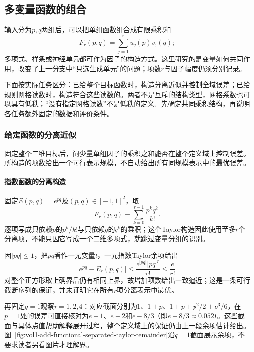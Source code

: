 \subsection{多变量函数的组合}
\label{subsubsec:multivariable-composition}

输入分为$p,q$两组后，可以把单组函数组合成有限乘积和
\[
  F_r(p,q)=\sum_{j=1}^{r}u_j(p)v_j(q);
\]
多项式、样条或神经单元都可作为因子的构造方式。这里研究的是变量如何共同作用，改变了上一分支中“只选生成单元”的问题；项数$r$与因子幅度仍须分别记录。

下面按实际任务区分：已给整个目标函数时，构造分离近似并控制全域误差；已给规则网格读数时，构造符合这些读数的。两者不是互斥的结构类型，网格系数也可以具有低秩；“没有指定网格读数”不是低秩的定义。先确定共同乘积结构，再说明各任务额外固定的数据和评价条件。

\subsubsection{给定函数的分离近似}
\label{subsubsec:separated-approximation}

固定整个二维目标后，问少量单组因子的乘积之和能否在整个定义域上控制误差。所构造的项数给出一个可行表示规模，不自动给出所有同规模表示中的最优误差。

\paragraph{指数函数的分离构造}

固定$E(p,q)=e^{pq}$及$(p,q)\in[-1,1]^2$，取
\begin{equation}
  E_r(p,q)=\sum_{k=0}^{r-1}\frac{p^kq^k}{k!}.
  \label{eq:functional-separated-taylor}
\end{equation}
逐项写成只依赖$p$的$p^k/k!$与只依赖$q$的$q^k$的乘积；这个Taylor构造因此使用至多$r$个分离项，不能只因它写成一个二维多项式，就跳过变量分组的识别。

因$|pq|\le1$，把$pq$看作一元变量$t$，一元指数Taylor余项给出
\[
  |e^{pq}-E_r(p,q)|\le\frac{e^{|pq|}|pq|^r}{r!}\le\frac{e}{r!}.
\]
对整个正方形取上确界后仍有相同上界，故增加项数给出一致逼近；这是一条可行截断序列的保证，并未证明它在所有$r$项分离表示中最优。

再固定$q=1$观察$r=1,2,4$：对应截面分别为$1$、$1+p$、$1+p+p^2/2+p^3/6$，在$p=1$处的误差可直接核对为$e-1$、$e-2$和$e-8/3$（即$e-8/3\approx0.052$）。这些截面与具体点值帮助解释展开过程，整个定义域上的保证仍由上一段余项估计给出。图~\ref{fig:vol1-add-functional-separated-taylor-remainder}沿$q=1$截面展示余项，不要求读者另看图片才理解界。


